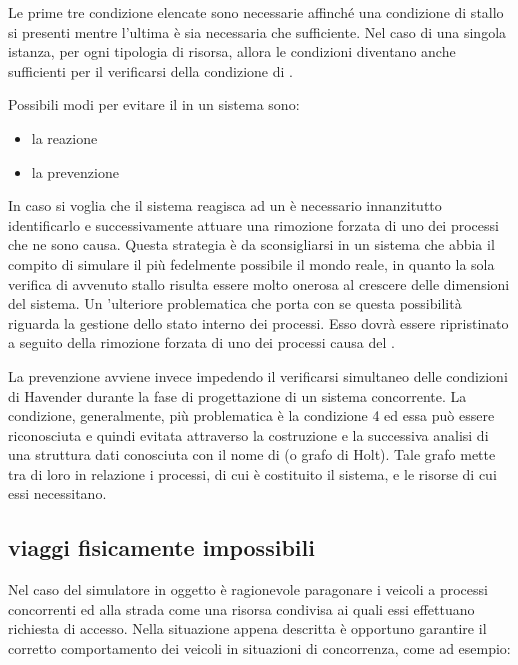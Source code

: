Le prime tre condizione elencate sono necessarie affinché una condizione di stallo si presenti mentre l'ultima è sia necessaria che sufficiente. Nel caso di una singola istanza, per ogni tipologia di risorsa, allora le condizioni diventano anche sufficienti per il verificarsi della condizione di .

Possibili modi per evitare il  in un sistema sono:

\begin{itemize}
\item{la reazione}
\item{la prevenzione}
\end{itemize}

In caso si voglia che il sistema reagisca ad un  è necessario innanzitutto identificarlo e successivamente attuare una rimozione forzata di uno dei processi che ne sono causa. Questa strategia è da sconsigliarsi in un sistema che abbia il compito di simulare il più fedelmente possibile il mondo reale, in quanto la sola verifica di avvenuto stallo risulta essere molto onerosa al crescere delle dimensioni del sistema. Un 'ulteriore problematica che porta con se questa possibilità riguarda la gestione dello stato interno dei processi. Esso dovrà essere ripristinato a seguito della rimozione forzata di uno dei processi causa del .

La prevenzione avviene invece impedendo il verificarsi simultaneo delle condizioni di Havender durante la fase di progettazione di un sistema concorrente. La condizione, generalmente, più problematica è la condizione 4 ed essa può essere riconosciuta e quindi evitata  attraverso la costruzione e la successiva analisi di una struttura dati conosciuta con il nome di  (o grafo di Holt). Tale grafo mette tra di loro in relazione i processi, di cui è costituito il sistema, e le risorse di cui essi necessitano.

\subsection*{viaggi fisicamente impossibili}
\label{problematiche_concorrenza_viaggi_fisicamente_impossibilii}
Nel caso del simulatore in oggetto è ragionevole paragonare i veicoli a processi concorrenti ed alla strada come una risorsa condivisa ai quali essi effettuano richiesta di accesso. Nella situazione appena descritta è opportuno garantire il corretto comportamento dei veicoli in situazioni di concorrenza, come ad esempio:

